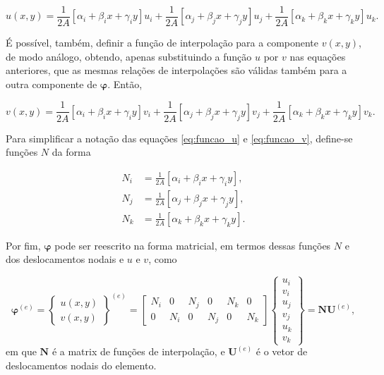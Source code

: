 \begin{equation}
    u(x,y) = \frac{1}{2A} \left[ \alpha_i + \beta_i x + \gamma_i y \right] u_i + \frac{1}{2A} \left[ \alpha_j + \beta_j x + \gamma_j y \right] u_j + \frac{1}{2A} \left[ \alpha_k + \beta_k x + \gamma_k y \right] u_k.
    \label{eq:funcao_u}
\end{equation}

É possível, também, definir a função de interpolação para a componente $v(x,y)$, de modo análogo, obtendo, apenas substituindo a função $u$ por $v$ nas equações anteriores, que as mesmas relações de interpolações são válidas também para a outra componente de $\bm{\varphi}$. Então, 

\begin{equation}
    v(x,y) = \frac{1}{2A} \left[ \alpha_i + \beta_i x + \gamma_i y \right] v_i + \frac{1}{2A} \left[ \alpha_j + \beta_j x + \gamma_j y \right] v_j + \frac{1}{2A} \left[ \alpha_k + \beta_k x + \gamma_k y \right] v_k.
    \label{eq:funcao_v}
\end{equation}

Para simplificar a notação das equações \ref{eq:funcao_u} e \ref{eq:funcao_v}, define-se funções $N$ da forma

\begin{align}
    N_i &= \frac{1}{2A} \left[ \alpha_i + \beta_i x + \gamma_i y \right], \\
    N_j &= \frac{1}{2A} \left[ \alpha_j + \beta_j x + \gamma_j y \right], \\
    N_k &= \frac{1}{2A} \left[ \alpha_k + \beta_k x + \gamma_k y \right].
\end{align}

Por fim, $\bm{\varphi}$ pode ser reescrito na forma matricial, em termos dessas funções $N$ e dos deslocamentos nodais e $u$ e $v$, como

\begin{equation}
    \bm{\varphi}^{(e)} = \begin{Bmatrix}
        u(x,y) \\ v(x,y)
    \end{Bmatrix}^{(e)} = \begin{bmatrix}
        N_i & 0 & N_j & 0 & N_k & 0 \\
        0 & N_i & 0 & N_j & 0 & N_k
    \end{bmatrix} \begin{Bmatrix}
        u_i \\ v_i \\ u_j \\ v_j \\ u_k \\ v_k
    \end{Bmatrix} = \bm{N} \bm{U}^{(e)},
\end{equation}
em que $\bm{N}$ é a matrix de funções de interpolação, e $\bm{U}^{(e)}$ é o vetor de deslocamentos nodais do elemento.


